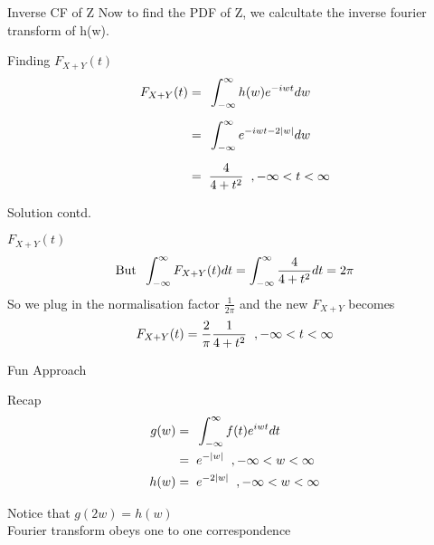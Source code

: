 \documentclass{beamer}
\providecommand{\abs}[1]{\vert#1\vert}
\begin{document}
\begin{frame}{Inverse CF of Z}
  Now to find the PDF of Z, we calcultate the inverse fourier transform of h(w).
  \begin{block}{Finding $F_{X+Y}(t)$}
    \begin{align}
      F_{X+Y}(t) =\hspace{0.2cm} & \int_{-\infty}^{\infty} h(w) {e}^{-iwt} dw           \\[0.2cm]
      =\hspace{0.2cm}            & \int_{-\infty}^{\infty} {e}^{-iwt-2\abs{w}} dw       \\[0.2cm]
      =\hspace{0.2cm}            & \frac{4}{4 + {t}^2} \hspace{0.2cm}, -\infty<t<\infty
    \end{align}
  \end{block}
\end{frame}
\begin{frame}{Solution contd.}
  \begin{block}{$F_{X+Y}(t)$}
    \begin{align}
      \text{But}\hspace{0.2cm} \int_{-\infty}^{\infty} F_{X+Y}(t) dt = \int_{-\infty}^{\infty} \frac{4}{4+{t^2}} dt= 2\pi
    \end{align}
    So we plug in the normalisation factor $\displaystyle\frac{1}{2\pi}$ and the new $F_{X+Y}$ becomes
    \begin{align}
      F_{X+Y}(t) = \frac{2}{\pi} \frac{1}{4+{t}^2}\hspace{0.2cm}, -\infty<t<\infty
    \end{align}
  \end{block}
\end{frame}
\begin{frame}{Fun Approach}
  \begin{block}{Recap}
    \begin{align}
      g(w) = & \hspace{0.2cm}  \int_{-\infty}^{\infty}  f(t) {e}^{iwt} dt     \label{0.0.13} \\
      =      & \hspace{0.2cm}  e^{-\abs{w}}\hspace{0.2cm}, -\infty<w<\infty                  \\
      h(w) = & \hspace{0.2cm} {e}^{-2\abs{w}}\hspace{0.2cm}, -\infty<w<\infty
    \end{align}
  \end{block}
  Notice that $g(2w) = h(w)$\\
  Fourier transform obeys one to one correspondence
\end{frame}
\end{document}
